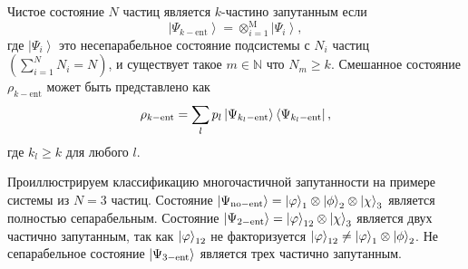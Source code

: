 \begin{definition}\label{def:manyparticle-entanglement}
  Чистое состояние $N$ частиц является $k$-частино запутанным если
  $$
  \left| \Psi_{k-\mathrm{ent}} \right\rangle
  	= \otimes^\mathrm{M}_{i=1} \left| \Psi_{i} \right\rangle,
  $$
  где $\left| \Psi_{i} \right\rangle$ это несепарабельное состояние подсистемы с $N_i$ частиц
  $\left( \sum_{i=1}^N N_i = N \right)$,
  и существует такое  $ m \in \mathbb{N}$ что $N_{m} \ge k$.
  Смешанное состояние $\rho_{k-\mathrm{ent}}$ может быть представлено как
  $$
  \rho_{k-\mathrm{ent}} =
  \sum\limits_{l} p_l \left| \Psi_{k_l-\mathrm{ent}} \right\rangle\left\langle \Psi_{k_l-\mathrm{ent}} \right|,
  $$
  где $k_l \geq k$ для любого $l$.
\end{definition}


Проиллюстрируем классификацию многочастичной запутанности на примере системы из $N = 3$ частиц.
Состояние
$\left| \Psi_\mathrm{no-ent} \right\rangle = \left| \varphi \right\rangle_1 \otimes \left| \phi \right\rangle_2 \otimes \left| \chi \right\rangle_3$
является полностью сепарабельным.
Состояние
$\left| \Psi_{2-\mathrm{ent}} \right\rangle = \left| \varphi \right\rangle_{12} \otimes \left| \chi \right\rangle_3$
является двух частично запутанным,
так как $\left| \varphi \right\rangle_{12}$ не факторизуется
$\left| \varphi \right\rangle_{12} \neq \left| \varphi \right\rangle_1 \otimes \left| \phi \right\rangle_2$.
Не сепарабельное состояние $\left| \Psi_{3-\mathrm{ent}} \right\rangle$ является трех частично запутанным.






%
%
%


